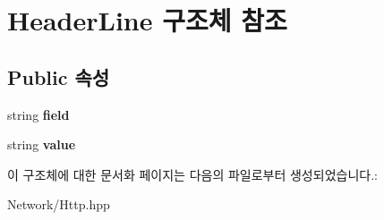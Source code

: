 \hypertarget{struct_header_line}{}\section{Header\+Line 구조체 참조}
\label{struct_header_line}
\subsection*{Public 속성}
\begin{DoxyCompactItemize}
\item 
\mbox{\label{struct_header_line_ac666157e371b3731b760f3269b47cc35}} 
string {\bfseries field}
\item 
\mbox{\label{struct_header_line_a25325fc473169a4cf57a70e0deb2c088}} 
string {\bfseries value}
\end{DoxyCompactItemize}


이 구조체에 대한 문서화 페이지는 다음의 파일로부터 생성되었습니다.\+:\begin{DoxyCompactItemize}
\item 
Network/Http.\+hpp\end{DoxyCompactItemize}
